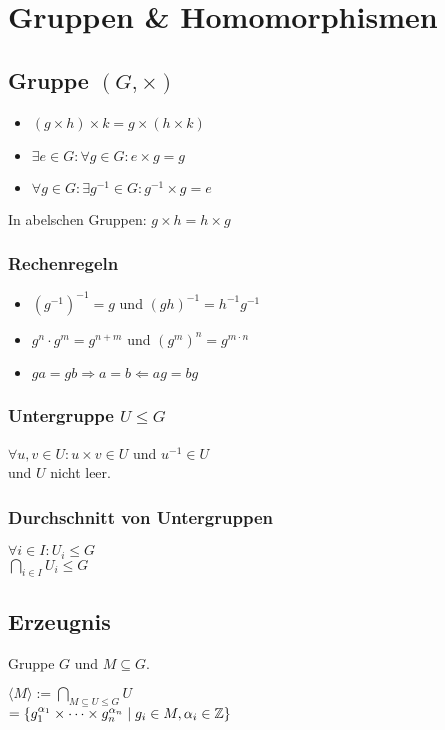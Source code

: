 \section*{Gruppen \& Homomorphismen}

\subsection*{Gruppe $(G,\times)$}
\begin{itemize}
	\item $(g \times h) \times k = g \times (h \times k)$
	\item $\exists e \in G: \forall g\in G: e\times g = g$
	\item $\forall g\in G: \exists g^{-1}\in G: g^{-1} \times g = e$
\end{itemize}
In abelschen Gruppen: $g\times h = h \times g$

\subsubsection*{Rechenregeln}
\begin{itemize}
	\item $(g^{-1})^{-1}=g$ und $(gh)^{-1}=h^{-1}g^{-1}$
	\item $g^n \cdot g^m = g^{n+m}$ und $(g^m)^n = g^{m\cdot n}$
	\item $ga=gb\Rightarrow a=b \Leftarrow ag=bg$
\end{itemize}

\subsubsection*{Untergruppe $U\le G$}
$\forall u,v\in U: u\times v \in U$ und $u^{-1}\in U$ \\
und $U$ nicht leer.

\subsubsection*{Durchschnitt von Untergruppen}
$\forall i\in I: U_i \le G$ \\
$\displaystyle \bigcap_{i\in I}U_i \le G$

\subsection*{Erzeugnis}
Gruppe $G$ und $M \subseteq G$.

$\displaystyle \langle M \rangle := \bigcap_{M\subseteq U \le G}U$ \\
$= \{g_1^{\alpha_1}\times\cdots\times g_n^{\alpha_n} \mid g_i\in M,\alpha_i\in\mathbb{Z}\} $

